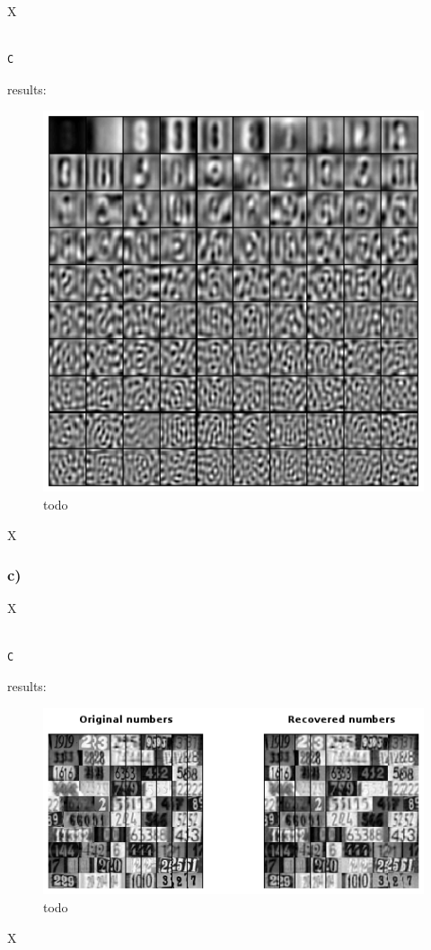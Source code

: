 X

\begin{lstlisting}[caption=todo]

C

\end{lstlisting}


results:

\begin{figure}[!ht]
\includegraphics[width=1\textwidth]{chapters/images/figure-3-7-b}
\caption{todo}
\end{figure}
X





\subsubsection{c)}

X

\begin{lstlisting}[caption=todo]

C

\end{lstlisting}


results:

\begin{figure}[!ht]
\includegraphics[width=1\textwidth]{chapters/images/figure-3-7-c}
\caption{todo}
\end{figure}
X



